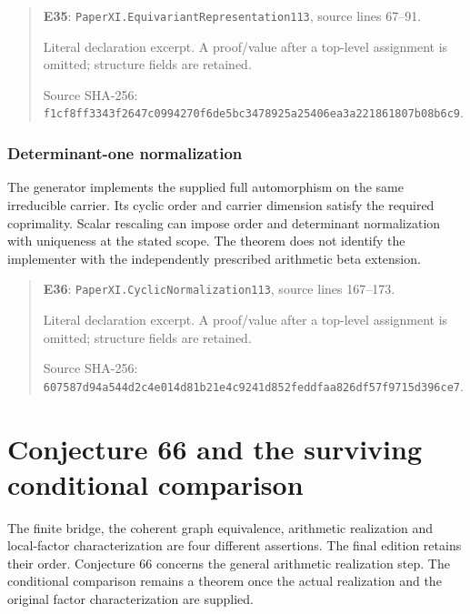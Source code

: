 \documentclass[10pt,oneside]{book}
\begin{document}
\begin{quote}\footnotesize\textbf{E35}: \nolinkurl{PaperXI.EquivariantRepresentation113}, source lines 67--91.\par Literal declaration excerpt. A proof/value after a top-level assignment is omitted; structure fields are retained.\par Source SHA-256: {\scriptsize\texttt{f1cf8ff3343f2647c0994270f6de5bc3478925a25406ea3a221861807b08b6c9}}.\end{quote}


\subsection{Determinant-one normalization}
\label{guide:E36}
The generator implements the supplied full automorphism on the same irreducible carrier. Its cyclic order and carrier dimension satisfy the required coprimality.
Scalar rescaling can impose order and determinant normalization with uniqueness at the stated scope. The theorem does not identify the implementer with the independently prescribed arithmetic beta extension.

\begin{quote}\footnotesize\textbf{E36}: \nolinkurl{PaperXI.CyclicNormalization113}, source lines 167--173.\par Literal declaration excerpt. A proof/value after a top-level assignment is omitted; structure fields are retained.\par Source SHA-256: {\scriptsize\texttt{607587d94a544d2c4e014d81b21e4c9241d852feddfaa826df57f9715d396ce7}}.\end{quote}


\chapter{Conjecture 66 and the surviving conditional comparison}
The finite bridge, the coherent graph equivalence, arithmetic realization and local-factor characterization are four different assertions. The final edition retains their order. Conjecture 66 concerns the general arithmetic realization step. The conditional comparison remains a theorem once the actual realization and the original factor characterization are supplied.
\end{document}
